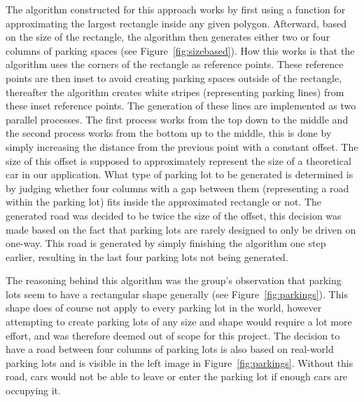 The algorithm constructed for this approach works by first using a function for approximating the largest rectangle inside any given polygon.
Afterward, based on the size of the rectangle, the algorithm then generates either two or four columns of parking spaces (see Figure~\ref{fig:sizebased}).
How this works is that the algorithm uses the corners of the rectangle as reference points.
These reference points are then inset to avoid creating parking spaces outside of the rectangle, thereafter the algorithm creates white stripes (representing parking lines) from these inset reference points.
The generation of these lines are implemented as two parallel processes. 
The first process works from the top down to the middle and the second process works from the bottom up to the middle, this is done by simply increasing the distance from the previous point with a constant offset. 
The size of this offset is supposed to approximately represent the size of a theoretical car in our application.
What type of parking lot to be generated is determined is by judging whether four columns with a gap between them (representing a road within the parking lot) fits inside the approximated rectangle or not. 
The generated road was decided to be twice the size of the offset, this decision was made based on the fact that parking lots are rarely designed to only be driven on one-way.
This road is generated by simply finishing the algorithm one step earlier, resulting in the last four parking lots not being generated. 

The reasoning behind this algorithm was the group's observation that parking lots seem to have a rectangular shape generally (see Figure~\ref{fig:parkings}).
This shape does of course not apply to every parking lot in the world, however attempting to create parking lots of any size and shape would require a lot more effort, and was therefore deemed out of scope for this project. 
The decision to have a road between four columns of parking lots is also based on real-world parking lots and is visible in the left image in Figure~\ref{fig:parkings}. 
Without this road, cars would not be able to leave or enter the parking lot if enough cars are occupying it.

